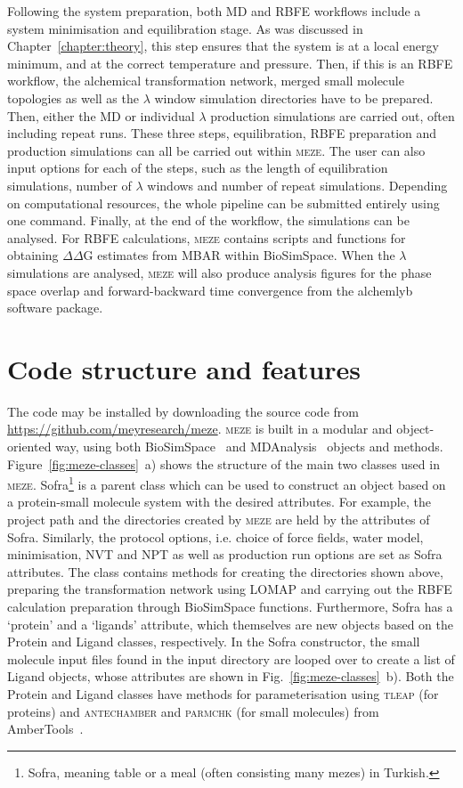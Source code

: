 Following the system preparation, both MD and RBFE workflows include a system minimisation and equilibration stage. As was discussed in Chapter~\ref{chapter:theory}, this step ensures that the system is at a local energy minimum, and at the correct temperature and pressure. Then, if this is an RBFE workflow, the alchemical transformation network, merged small molecule topologies as well as the $\lambda$ window simulation directories have to be prepared. Then, either the MD or individual $\lambda$ production simulations are carried out, often including repeat runs. These three steps, equilibration, RBFE preparation and production simulations can all be carried out within \textsc{meze}. The user can also input options for each of the steps, such as the length of equilibration simulations, number of $\lambda$ windows and number of repeat simulations. Depending on computational resources, the whole pipeline can be submitted entirely using one command. Finally, at the end of the workflow, the simulations can be analysed. For RBFE calculations, \textsc{meze} contains scripts and functions for obtaining $\Delta\Delta$G estimates from MBAR within BioSimSpace. When the $\lambda$ simulations are analysed, \textsc{meze} will also produce analysis figures for the phase space overlap and forward-backward time convergence from the alchemlyb~\cite{wu_alchemlyb_2024} software package. 

\section{Code structure and features}

The code may be installed by downloading the source code from \url{https://github.com/meyresearch/meze}. \textsc{meze} is built in a modular and object-oriented way, using both BioSimSpace~\cite{hedges_biosimspace_2019} and MDAnalysis~\cite{michaud-agrawal_mdanalysis_2011} objects and methods. Figure~\ref{fig:meze-classes}~a) shows the structure of the main two classes used in \textsc{meze}. Sofra\footnote[2]{Sofra, meaning table or a meal (often consisting many mezes) in Turkish.} is a parent class which can be used to construct an object based on a protein-small molecule system with the desired attributes. For example, the project path and the directories created by \textsc{meze} are held by the attributes of Sofra. Similarly, the protocol options, i.e. choice of force fields, water model, minimisation, NVT and NPT as well as production run options are set as Sofra attributes. The class contains methods for creating the directories shown above, preparing the transformation network using LOMAP and carrying out the RBFE calculation preparation through BioSimSpace functions. Furthermore, Sofra has a `protein' and a `ligands' attribute, which themselves are new objects based on the Protein and Ligand classes, respectively. In the Sofra constructor, the small molecule input files found in the input directory are looped over to create a list of Ligand objects, whose attributes are shown in Fig.~\ref{fig:meze-classes}~b). Both the Protein and Ligand classes have methods for parameterisation using \textsc{tleap} (for proteins) and \textsc{antechamber} and \textsc{parmchk} (for small molecules) from AmberTools~\cite{case_ambertools_2023}. 

